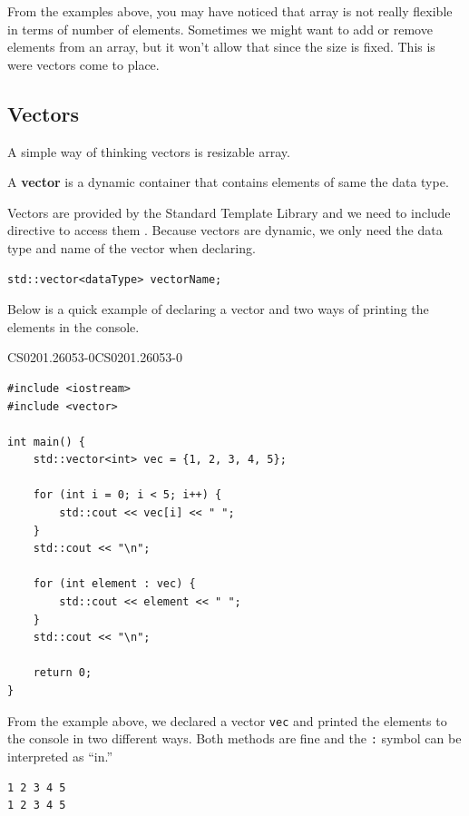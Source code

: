 \documentclass[../../main.tex]{subfiles}
\begin{document}
From the examples above, you may have noticed that array is not
really flexible in terms of number of elements. Sometimes we
might want to add or remove elements from an array, but it won't
allow that since the size is fixed. This is were vectors come
to place.

\subsection{Vectors}

A simple way of thinking vectors is resizable array.

\begin{definition}{}{}
A \textbf{vector} is a dynamic container that contains elements of
same the data type.
\end{definition}

Vectors are provided by the Standard Template Library and we need
to include directive to access them \cite{CS02-5}. Because
vectors are dynamic, we only need the data type and name of the
vector when declaring.

\begin{outputbox}
\begin{lstlisting}[style=basic]
std::vector<dataType> vectorName;
\end{lstlisting}
\end{outputbox}

Below is a quick example of declaring a vector and two ways of
printing the elements in the console.

\begin{cppbox}{CS0201.26053-0}{CS0201.26053-0}
\begin{lstlisting}[style=cppstyle]
#include <iostream>
#include <vector>

int main() {
    std::vector<int> vec = {1, 2, 3, 4, 5};

    for (int i = 0; i < 5; i++) {
        std::cout << vec[i] << " ";
    }
    std::cout << "\n";

    for (int element : vec) {
        std::cout << element << " ";
    }
    std::cout << "\n";

    return 0;
}
\end{lstlisting}
\end{cppbox}

From the example above, we declared a vector \verb|vec| and printed
the elements to the console in two different ways. Both methods are
fine and the \verb|:| symbol can be interpreted as ``in.''

\begin{outputbox}
\begin{lstlisting}[style=basic]
1 2 3 4 5
1 2 3 4 5
\end{lstlisting}
\end{outputbox}
\end{document}
